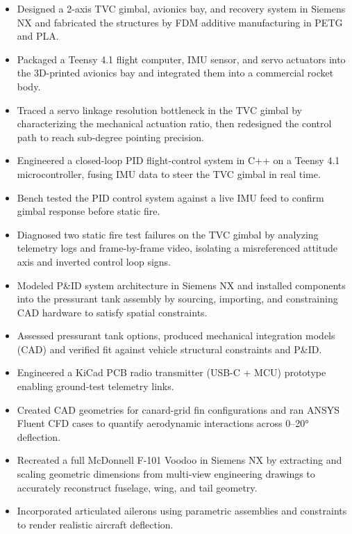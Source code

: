 \begin{itemize}
  \item Designed a 2-axis TVC gimbal, avionics bay, and recovery system in Siemens NX and fabricated the structures by FDM additive manufacturing in PETG and PLA.
  \item Packaged a Teensy 4.1 flight computer, IMU sensor, and servo actuators into the 3D-printed avionics bay and integrated them into a commercial rocket body.
  \item Traced a servo linkage resolution bottleneck in the TVC gimbal by characterizing the mechanical actuation ratio, then redesigned the control path to reach sub-degree pointing precision.
  \item Engineered a closed-loop PID flight-control system in C++ on a Teensy 4.1 microcontroller, fusing IMU data to steer the TVC gimbal in real time.
  \item Bench tested the PID control system against a live IMU feed to confirm gimbal response before static fire.
  \item Diagnosed two static fire test failures on the TVC gimbal by analyzing telemetry logs and frame-by-frame video, isolating a misreferenced attitude axis and inverted control loop signs.
\end{itemize}
\entrygap

\begin{itemize}
  \item Modeled P\&ID system architecture in Siemens NX and installed components into the pressurant tank assembly by sourcing, importing, and constraining CAD hardware to satisfy spatial constraints.
  \item Assessed pressurant tank options, produced mechanical integration models (CAD) and verified fit against vehicle structural constraints and P\&ID.
  \item Engineered a KiCad PCB radio transmitter (USB-C + MCU) prototype enabling ground-test telemetry links.
  \item Created CAD geometries for canard-grid fin configurations and ran ANSYS Fluent CFD cases to quantify aerodynamic interactions across 0--20° deflection.
\end{itemize}
\entrygap

\begin{itemize}
  \item Recreated a full McDonnell F-101 Voodoo in Siemens NX by extracting and scaling geometric dimensions from multi-view engineering drawings to accurately reconstruct fuselage, wing, and tail geometry.
  \item Incorporated articulated ailerons using parametric assemblies and constraints to render realistic aircraft deflection.
\end{itemize}

